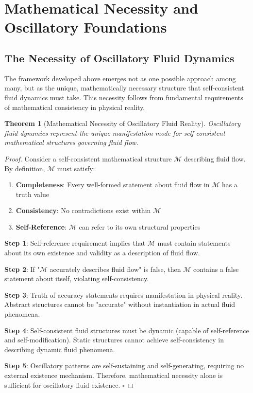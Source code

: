 \documentclass[12pt,a4paper]{article}
\newtheorem{theorem}{Theorem}
\begin{document}
\section{Mathematical Necessity and Oscillatory Foundations}

\subsection{The Necessity of Oscillatory Fluid Dynamics}

The framework developed above emerges not as one possible approach among many, but as the unique, mathematically necessary structure that self-consistent fluid dynamics must take. This necessity follows from fundamental requirements of mathematical consistency in physical reality.

\begin{theorem}[Mathematical Necessity of Oscillatory Fluid Reality]
Oscillatory fluid dynamics represent the unique manifestation mode for self-consistent mathematical structures governing fluid flow.
\end{theorem}

\begin{proof}
Consider a self-consistent mathematical structure $\mathcal{M}$ describing fluid flow. By definition, $\mathcal{M}$ must satisfy:
\begin{enumerate}
\item \textbf{Completeness}: Every well-formed statement about fluid flow in $\mathcal{M}$ has a truth value
\item \textbf{Consistency}: No contradictions exist within $\mathcal{M}$
\item \textbf{Self-Reference}: $\mathcal{M}$ can refer to its own structural properties
\end{enumerate}

\textbf{Step 1}: Self-reference requirement implies that $\mathcal{M}$ must contain statements about its own existence and validity as a description of fluid flow.

\textbf{Step 2}: If "$\mathcal{M}$ accurately describes fluid flow" is false, then $\mathcal{M}$ contains a false statement about itself, violating self-consistency.

\textbf{Step 3}: Truth of accuracy statements requires manifestation in physical reality. Abstract structures cannot be "accurate" without instantiation in actual fluid phenomena.

\textbf{Step 4}: Self-consistent fluid structures must be dynamic (capable of self-reference and self-modification). Static structures cannot achieve self-consistency in describing dynamic fluid phenomena.

\textbf{Step 5}: Oscillatory patterns are self-sustaining and self-generating, requiring no external existence mechanism. Therefore, mathematical necessity alone is sufficient for oscillatory fluid existence. $\square$
\end{proof}
\end{document}
